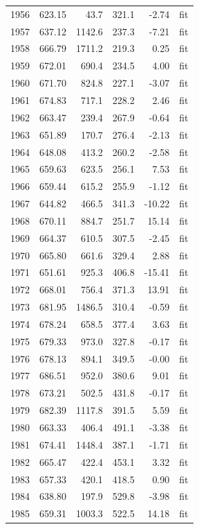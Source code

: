 \begin{longtable}{rrrrrl}
1956 & 623.15 & 43.7 & 321.1 & -2.74 & fit \\
1957 & 637.12 & 1142.6 & 237.3 & -7.21 & fit \\
1958 & 666.79 & 1711.2 & 219.3 & 0.25 & fit \\
1959 & 672.01 & 690.4 & 234.5 & 4.00 & fit \\
1960 & 671.70 & 824.8 & 227.1 & -3.07 & fit \\
1961 & 674.83 & 717.1 & 228.2 & 2.46 & fit \\
1962 & 663.47 & 239.4 & 267.9 & -0.64 & fit \\
1963 & 651.89 & 170.7 & 276.4 & -2.13 & fit \\
1964 & 648.08 & 413.2 & 260.2 & -2.58 & fit \\
1965 & 659.63 & 623.5 & 256.1 & 7.53 & fit \\
1966 & 659.44 & 615.2 & 255.9 & -1.12 & fit \\
1967 & 644.82 & 466.5 & 341.3 & -10.22 & fit \\
1968 & 670.11 & 884.7 & 251.7 & 15.14 & fit \\
1969 & 664.37 & 610.5 & 307.5 & -2.45 & fit \\
1970 & 665.80 & 661.6 & 329.4 & 2.88 & fit \\
1971 & 651.61 & 925.3 & 406.8 & -15.41 & fit \\
1972 & 668.01 & 756.4 & 371.3 & 13.91 & fit \\
1973 & 681.95 & 1486.5 & 310.4 & -0.59 & fit \\
1974 & 678.24 & 658.5 & 377.4 & 3.63 & fit \\
1975 & 679.33 & 973.0 & 327.8 & -0.17 & fit \\
1976 & 678.13 & 894.1 & 349.5 & -0.00 & fit \\
1977 & 686.51 & 952.0 & 380.6 & 9.01 & fit \\
1978 & 673.21 & 502.5 & 431.8 & -0.17 & fit \\
1979 & 682.39 & 1117.8 & 391.5 & 5.59 & fit \\
1980 & 663.33 & 406.4 & 491.1 & -3.38 & fit \\
1981 & 674.41 & 1448.4 & 387.1 & -1.71 & fit \\
1982 & 665.47 & 422.4 & 453.1 & 3.32 & fit \\
1983 & 657.33 & 420.1 & 418.5 & 0.90 & fit \\
1984 & 638.80 & 197.9 & 529.8 & -3.98 & fit \\
1985 & 659.31 & 1003.3 & 522.5 & 14.18 & fit \\

\end{longtable}
